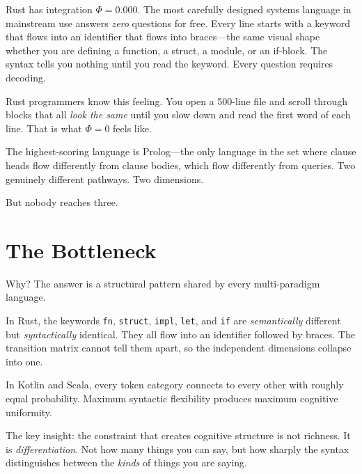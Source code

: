 \documentclass[11pt,a4paper]{article}
\begin{document}
Rust has integration $\Phi = 0.000$. The most carefully designed systems language in mainstream use answers \emph{zero} questions for free. Every line starts with a keyword that flows into an identifier that flows into braces---the same visual shape whether you are defining a function, a struct, a module, or an if-block. The syntax tells you nothing until you read the keyword. Every question requires decoding.

Rust programmers know this feeling. You open a 500-line file and scroll through blocks that all \emph{look the same} until you slow down and read the first word of each line. That is what $\Phi = 0$ feels like.

The highest-scoring language is Prolog---the only language in the set where clause heads flow differently from clause bodies, which flow differently from queries. Two genuinely different pathways. Two dimensions.

But nobody reaches three.

\section{The Bottleneck}

Why? The answer is a structural pattern shared by every multi-paradigm language.

In Rust, the keywords \texttt{fn}, \texttt{struct}, \texttt{impl}, \texttt{let}, and \texttt{if} are \emph{semantically} different but \emph{syntactically} identical. They all flow into an identifier followed by braces. The transition matrix cannot tell them apart, so the independent dimensions collapse into one.

In Kotlin and Scala, every token category connects to every other with roughly equal probability. Maximum syntactic flexibility produces maximum cognitive uniformity.

The key insight: the constraint that creates cognitive structure is not richness. It is \emph{differentiation}. Not how many things you can say, but how sharply the syntax distinguishes between the \emph{kinds} of things you are saying.
\end{document}
